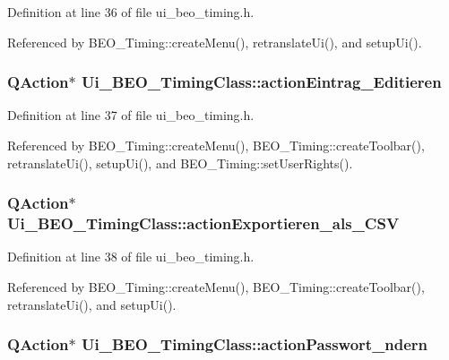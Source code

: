Definition at line 36 of file ui\_\-beo\_\-timing.h.

Referenced by BEO\_\-Timing::createMenu(), retranslateUi(), and setupUi().\hypertarget{class_ui___b_e_o___timing_class_03f22fbfb4e131463c67bcd71bf6c8ab}{
\subsubsection[actionEintrag\_\-Editieren]{\setlength{\rightskip}{0pt plus 5cm}QAction$\ast$ {\bf Ui\_\-BEO\_\-TimingClass::actionEintrag\_\-Editieren}}}
\label{class_ui___b_e_o___timing_class_03f22fbfb4e131463c67bcd71bf6c8ab}




Definition at line 37 of file ui\_\-beo\_\-timing.h.

Referenced by BEO\_\-Timing::createMenu(), BEO\_\-Timing::createToolbar(), retranslateUi(), setupUi(), and BEO\_\-Timing::setUserRights().\hypertarget{class_ui___b_e_o___timing_class_d8c3dfc7a32aaca85ec882f6095e769a}{
\subsubsection[actionExportieren\_\-als\_\-CSV]{\setlength{\rightskip}{0pt plus 5cm}QAction$\ast$ {\bf Ui\_\-BEO\_\-TimingClass::actionExportieren\_\-als\_\-CSV}}}
\label{class_ui___b_e_o___timing_class_d8c3dfc7a32aaca85ec882f6095e769a}




Definition at line 38 of file ui\_\-beo\_\-timing.h.

Referenced by BEO\_\-Timing::createMenu(), BEO\_\-Timing::createToolbar(), retranslateUi(), and setupUi().\hypertarget{class_ui___b_e_o___timing_class_a1d2e32aefdb7aa24d0403f01d58a715}{
\subsubsection[actionPasswort\_\-ndern]{\setlength{\rightskip}{0pt plus 5cm}QAction$\ast$ {\bf Ui\_\-BEO\_\-TimingClass::actionPasswort\_\-ndern}}}
\label{class_ui___b_e_o___timing_class_a1d2e32aefdb7aa24d0403f01d58a715}




